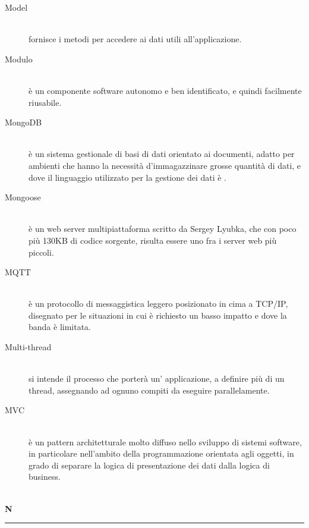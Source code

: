 \documentclass[12pt,a4paper]{article}
\begin{document}
\begin{description}
\item[Model] 
\hfill\\ fornisce i metodi per accedere ai dati utili all'applicazione.

\item[Modulo] 
\hfill\\ è un componente software autonomo e ben identificato, e quindi facilmente riusabile.

\item[MongoDB] 
\hfill\\ è un sistema gestionale di basi di dati  orientato ai documenti, adatto per ambienti che hanno la necessità d'immagazzinare grosse quantità di dati, e dove il linguaggio utilizzato per la gestione dei dati è .

\item[Mongoose] 
\hfill\\ è un web server multipiattaforma scritto da Sergey Lyubka, che con poco più 130KB di codice sorgente, risulta essere uno fra i server web più piccoli.

\item[MQTT] 
\hfill\\ è un protocollo di messaggistica leggero posizionato in cima a TCP/IP, disegnato per le situazioni in cui è richiesto un basso impatto e dove la banda è limitata.

\item[Multi-thread] 
\hfill\\ si intende il processo che porterà un' applicazione, a definire più di un thread, assegnando ad ognuno compiti da eseguire parallelamente.

\item[MVC] 
\hfill\\ è un pattern architetturale molto diffuso nello sviluppo di sistemi software, in particolare nell'ambito della programmazione orientata agli oggetti, in grado di separare la logica di presentazione dei dati dalla logica di business.
\end{description}

\newpage

\begin{center}
\hfill\\
	\LARGE \textbf{N}
\hfill\\
\rule[15pt]{30pt}{0.5pt}
\end{center}
\end{document}
